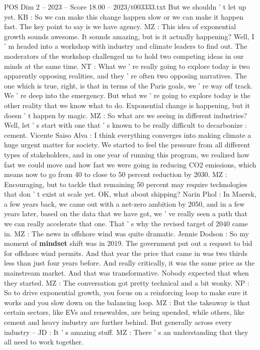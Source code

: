 \begin{textsample}{POS Dim 2 – 2023 – Score 18.00 – 2023/t003333.txt}
But we shouldn ' t let up yet.
KB : So we can make this change happen slow or we can make it happen fast.
The key point to say is we have agency.
MZ : This idea of exponential growth sounds awesome.
It sounds amazing, but is it actually happening?
Well, I ' m headed into a workshop with industry and climate leaders to find out.
The moderators of the workshop challenged us to hold two competing ideas in our minds at the same time.
NT : What we ' re really going to explore today is two apparently opposing realities, and they ' re often two opposing narratives.
The one which is true, right, is that in terms of the Paris goals, we ' re way off track.
We ' re deep into the emergency.
But what we ' re going to explore today is the other reality that we know what to do.
Exponential change is happening, but it doesn ' t happen by magic.
MZ : So what are we seeing in different industries?
Well, let ' s start with one that ' s known to be really difficult to decarbonize : cement.
Vicente Saiso Alva : I think everything converges into making climate a huge urgent matter for society.
We started to feel the pressure from all different types of stakeholders, and in one year of running this program, we realized how fast we could move and how fast we were going in reducing CO2 emissions, which means now to go from 40 to close to 50 percent reduction by 2030.
MZ : Encouraging, but to tackle that remaining 50 percent may require technologies that don ' t exist at scale yet.
OK, what about shipping?
Narin Phol : In Maersk, a few years back, we came out with a net-zero ambition by 2050, and in a few years later, based on the data that we have got, we ' ve really seen a path that we can really accelerate that one.
That ' s why the revised target of 2040 came in.
MZ : The news in offshore wind was quite dramatic.
Jennie Dodson : So my moment of \textbf{mindset} shift was in 2019.
The government put out a request to bid for offshore wind permits.
And that year the price that came in was two thirds less than just four years before.
And really critically, it was the same price as the mainstream market.
And that was transformative.
Nobody expected that when they started.
MZ : The conversation got pretty technical and a bit wonky.
NP : So to drive exponential growth, you focus on a reinforcing loop to make sure it works and you slow down on the balancing loop.
MZ : But the takeaway is that certain sectors, like EVs and renewables, are being upended, while others, like cement and heavy industry are further behind.
But generally across every industry -- JD : It ' s amazing stuff.
MZ : There ' s an understanding that they all need to work together.

\end{textsample}
